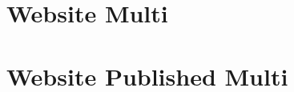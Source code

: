 \documentclass[letterpaper,10pt,spanish]{sphinxmanual}
\begin{document}
\section{Website Multi}
\label{\detokenize{tecnico/mixin-models/website-multi:website-multi}}\label{\detokenize{tecnico/mixin-models/website-multi:id1}}\label{\detokenize{tecnico/mixin-models/website-multi::doc}}

\section{Website Published Multi}
\label{\detokenize{tecnico/mixin-models/website-published-multi:website-published-multi}}\label{\detokenize{tecnico/mixin-models/website-published-multi:id1}}\label{\detokenize{tecnico/mixin-models/website-published-multi::doc}}


\renewcommand{\indexname}{Índice}
\printindex
\end{document}
